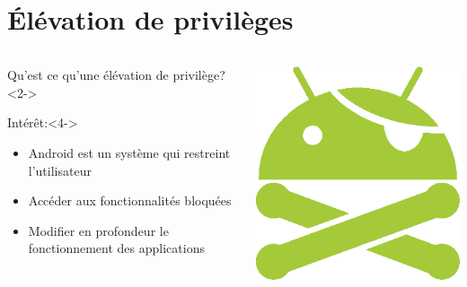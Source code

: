 \documentclass[aspectratio=1610, ]{beamer}%
\begin{document}
\section{Élévation de privilèges}
  \begin{frame}
    \slidetitle[]
    \noindent
    \begin{columns}
      \begin{column}{0.7\linewidth}
        \begin{block}{Qu'est ce qu'une élévation de privilège?}<2->
        \end{block}
        \begin{block}{Intérêt:}<4->
          \begin{itemize}
            \item<5-> Android est un système qui restreint l'utilisateur
            \item<6-> Accéder aux fonctionnalités bloquées
            \item<7-> Modifier en profondeur le fonctionnement des applications
          \end{itemize}
        \end{block}
      \end{column}
      \begin{column}{0.25\linewidth}
        \includegraphics[width=1\linewidth]{img/android_root.png}
      \end{column}
    \end{columns}
  \end{frame}
\end{document}
